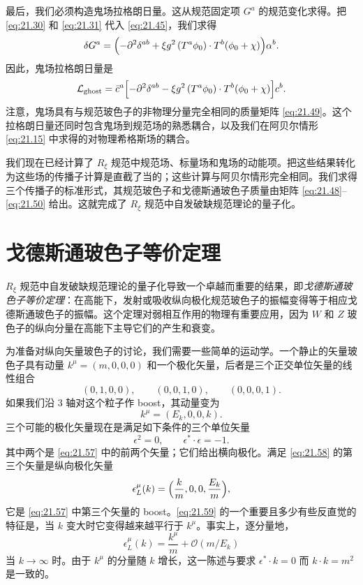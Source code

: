 最后，我们必须构造鬼场拉格朗日量。这从规范固定项 $G^a$ 的规范变化求得。把 \eqref{eq:21.30} 和 \eqref{eq:21.31} 代入 \eqref{eq:21.45}，我们求得
\begin{equation}
  \delta G^a = \Bigl( -\partial^2\delta^{ab} + \xi g^2\,(T^a\phi_0)\cdot
    T^b(\phi_0 + \chi) \Bigr)\alpha^b .
  \label{eq:21.51}
\end{equation}
因此，鬼场拉格朗日量是
\begin{equation}
  \mathcal{L}_{\mathrm{ghost}} = \bar{c}^a\Bigl[ -\partial^2\delta^{ab}
    - \xi g^2\,(T^a\phi_0)\cdot T^b(\phi_0 + \chi) \Bigr]c^b .
  \label{eq:21.52}
\end{equation}
注意，鬼场具有与规范玻色子的非物理分量完全相同的质量矩阵 \eqref{eq:21.49}。这个拉格朗日量还同时包含鬼场到规范场的熟悉耦合，以及我们在阿贝尔情形 \eqref{eq:21.15} 中求得的对物理希格斯场的耦合。

我们现在已经计算了 $R_\xi$ 规范中规范场、标量场和鬼场的动能项。把这些结果转化为这些场的传播子计算是直截了当的；这些计算与阿贝尔情形完全相同。我们求得三个传播子的标准形式，其规范玻色子和戈德斯通玻色子质量由矩阵 \eqref{eq:21.48}--\eqref{eq:21.50} 给出。这就完成了 $R_\xi$ 规范中自发破缺规范理论的量子化。

\section{戈德斯通玻色子等价定理}

$R_\xi$ 规范中自发破缺规范理论的量子化导致一个卓越而重要的结果，即\emph{戈德斯通玻色子等价定理}：在高能下，发射或吸收纵向极化规范玻色子的振幅变得等于相应戈德斯通玻色子的振幅。这个定理对弱相互作用的物理有重要应用，因为 $W$ 和 $Z$ 玻色子的纵向分量在高能下主导它们的产生和衰变。

为准备对纵向矢量玻色子的讨论，我们需要一些简单的运动学。一个静止的矢量玻色子具有动量 $k^\mu = (m, 0, 0, 0)$ 和一个极化矢量，后者是三个正交单位矢量的线性组合
\begin{equation}
  (0, 1, 0, 0),\qquad (0, 0, 1, 0),\qquad (0, 0, 0, 1) .
  \label{eq:21.57}
\end{equation}
如果我们沿 3 轴对这个粒子作 boost，其动量变为
\begin{equation}
  k^\mu = (E_k, 0, 0, k) .
\end{equation}
三个可能的极化矢量现在是满足如下条件的三个单位矢量
\begin{equation}
  \epsilon^2 = 0,\qquad \epsilon^{*}\cdot\epsilon = -1 .
  \label{eq:21.58}
\end{equation}
其中两个是 \eqref{eq:21.57} 中的前两个矢量；它们给出横向极化。满足 \eqref{eq:21.58} 的第三个矢量是纵向极化矢量
\begin{equation}
  \epsilon^\mu_L(k) = \Bigl( \frac{k}{m}, 0, 0, \frac{E_k}{m} \Bigr) ,
  \label{eq:21.59}
\end{equation}
它是 \eqref{eq:21.57} 中第三个矢量的 boost。\eqref{eq:21.59} 的一个重要且多少有些反直觉的特征是，当 $k$ 变大时它变得越来越平行于 $k^\mu$。事实上，逐分量地，
\begin{equation}
  \epsilon^\mu_L(k) = \frac{k^\mu}{m} + \mathcal{O}(m/E_k)
  \label{eq:21.60}
\end{equation}
当 $k\to\infty$ 时。由于 $k^\mu$ 的分量随 $k$ 增长，这一陈述与要求 $\epsilon^{*}\cdot k = 0$ 而 $k\cdot k = m^2$ 是一致的。

